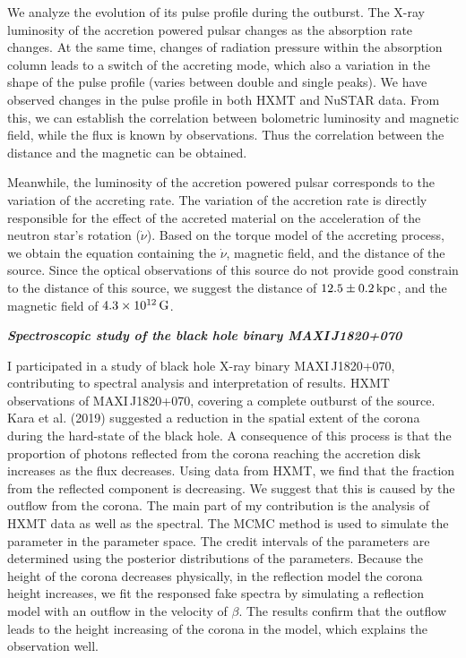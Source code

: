 \documentclass[a4paper,12pt]{article}
\begin{document}
We analyze the evolution of its pulse profile during the outburst. The X-ray luminosity of the accretion powered pulsar changes as the absorption rate changes. At the same time, changes of radiation pressure within the absorption column leads to a switch of the accreting mode, which also a variation in the shape of the pulse profile (varies between double and single peaks). We have observed changes in the pulse profile in both HXMT and NuSTAR data. From this, we can establish the correlation between bolometric luminosity and magnetic field, while the flux is known by observations. Thus the correlation between the distance and the magnetic can be obtained.

Meanwhile, the luminosity of the accretion powered pulsar corresponds to the variation of the accreting rate. The variation of the accretion rate is directly responsible for the effect of the accreted material on the acceleration of the neutron star's rotation ($\dot{\nu}$). Based on the torque model of the accreting process, we obtain the equation containing the $\dot{\nu}$, magnetic field, and the distance of the source. Since the optical observations of this source do not provide good constrain to the distance of this source, we suggest the distance of $12.5\pm0.2\,\rm{kpc}$, and the magnetic field of $4.3\times10^{12}\,\rm{G}$.

\newpage
\textbf{\emph{Spectroscopic study of the black hole binary MAXI\,J1820+070}}

I participated in a study of black hole X-ray binary MAXI\,J1820+070, contributing to spectral analysis and interpretation of results.
HXMT observations of MAXI\,J1820+070, covering a complete outburst of the source. Kara et al. (2019) suggested a reduction in the spatial extent of the corona during the hard-state of the black hole. A consequence of this process is that the proportion of photons reflected from the corona reaching the accretion disk increases as the flux decreases. Using data from HXMT, we find that the fraction from the reflected component is decreasing. We suggest that this is caused by the outflow from the corona. The main part of my contribution is the analysis of HXMT data as well as the spectral. The MCMC method is used to simulate the parameter in the parameter space. The credit intervals of the parameters are determined using the posterior distributions of the parameters. Because the height of the corona decreases physically, in the reflection model the corona height increases, we fit the responsed fake spectra by simulating a reflection model with an outflow in the velocity of $\beta$. The results confirm that the outflow leads to the height increasing of the corona in the model, which explains the observation well.
\end{document}
